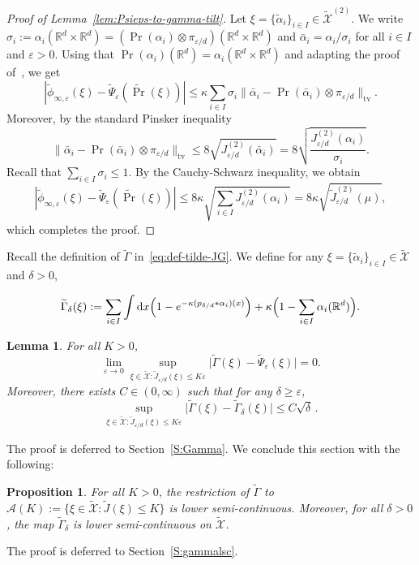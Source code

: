 \documentclass[a4paper,11pt]{amsart}
\numberwithin{equation}{section}
\newtheorem{lemma}[theorem]{Lemma}
\newtheorem{proposition}[theorem]{Proposition}
\newcommand{\bbR}{{\ensuremath{\mathbb R}} }
\newcommand{\cA}{{\ensuremath{\mathcal A}} }
\newcommand{\cX}{{\ensuremath{\mathcal X}} }
\newcommand{\ga}{\alpha}
\newcommand{\gep}{\varepsilon}
\newcommand{\gk}{\kappa}
\newcommand{\gs}{\sigma}
\renewcommand{\tilde}{\widetilde}          %
\newcommand{\dd}{\text{\rm d}}             %
\newcommand{\8}{\infty}
\newcommand{\beq}{\begin{equation}}
\newcommand{\eeq}{\end{equation}}
\newcommand{\tv}{\mathrm{tv}}
\begin{document}
\begin{proof}[Proof of Lemma~\ref{lem:Psieps-to-gamma-tilt}]
Let $\xi =\{\tilde\ga_i\}_{i\in I}\in\tilde\cX^{(2)}$.
We write $\gs_i := \ga_i(\bbR^d\times \bbR^d) = (\Pr(\ga_i)\otimes \pi_{ \gep/d})(\bbR^d\times \bbR^d)$ and $\bar \ga_i = \ga_i / \gs_i$ for all $i\in I$ and $\gep>0$. Using that $\Pr(\ga_i)(\bbR^d)= \ga_i(\bbR^d \times \bbR^d)$ and adapting the proof of~\cite[Lemma 6]{BBH2001}, we get
\beq
|\tilde \phi_{\infty,\gep}(\xi)-\tilde\Psi_\gep(\tilde\Pr(\xi))| \le \gk \sum_{i\in I} \gs_i \|\bar \ga_i - \Pr(\bar \ga_i)\otimes \pi_{ \gep/d}\|_{\tv}.
\eeq
Moreover, by the standard Pinsker inequality~\cite[Lemma 5(e)]{BBH2001}
\beq
\|\bar \ga_i - \Pr(\bar \ga_i)\otimes \pi_{ \gep/d}\|_{\tv} \le 8 \sqrt{J^{(2)}_{ \gep/d}(\bar \ga_i)} = 8\sqrt{\frac{J^{(2)}_{ \gep/d}(\ga_i)}{\gs_i }}.
\eeq
Recall that $\sum_{i\in I} \gs_i \le 1$. By the Cauchy-Schwarz inequality, we obtain
\beq
|\tilde \phi_{\infty,\gep}(\xi)-\tilde\Psi_\gep(\tilde\Pr(\xi))| \le 8\gk \sqrt{\sum_{i\in I} J^{(2)}_{ \gep/d}(\ga_i)} = 8\gk \sqrt{\tilde J^{(2)}_{ \gep/d}(\mu)},
\eeq
which completes the proof.
\end{proof}
%
Recall the definition of $\tilde\Gamma$ in~\eqref{eq:def-tilde-JG}. We define for any $\xi=\{\tilde\alpha_i\}_{i\in I}\in\tilde\cX$ and $\delta>0$,

\beq
\tilde \Gamma_\delta(\xi):= \sum_{i\in I} \int\dd x \Big(1-e^{-\gk (p_{ \delta/d}* \alpha_i)(x)}\Big) + \gk\Big(1- \sum_{i\in I} \ga_i(\bbR^d) \Big).
\eeq

%
\begin{lemma}\label{lem:Psieps-to-gamma} For all $K>0$,
	\beq
	\label{eq:Psieps-to-gamma}
	\lim_{\gep \to 0} \sup_{\xi\in \tilde\cX \colon \tilde J_{ \gep/d}(\xi) \le K\gep}
	\Big|\tilde\Gamma(\xi) - \tilde\Psi_\gep(\xi)\Big| =0.
	\eeq
	Moreover, there exists $C\in(0,\infty)$ such that for any $\delta\geq \gep$,
\beq
\label{eq:Psieps-to-gamma2}
\sup_{\xi\in\tilde\cX \colon \tilde{J}_{ \gep/d}(\xi)\leq K\gep}\Big| \tilde\Gamma(\xi)-\tilde\Gamma_\delta(\xi)\Big|\le C\sqrt{\delta}\,.
\eeq	
\end{lemma}
%
The proof is deferred to Section~\ref{S:Gamma}. We conclude this section with the following:
\begin{proposition}\label{prop:restGamma-lsc} 
For all $K>0$, the restriction of $\tilde \Gamma$ to $\cA(K) := \{\xi \in \tilde \cX\colon \tilde J(\xi) \le K\}$ is lower semi-continuous. Moreover, for all $\delta>0$, the map $\tilde\Gamma_\delta$ is lower semi-continuous on $\tilde\cX$.
\end{proposition}
%
The proof is deferred to Section~\ref{S:gammalsc}.
%
\end{document}
